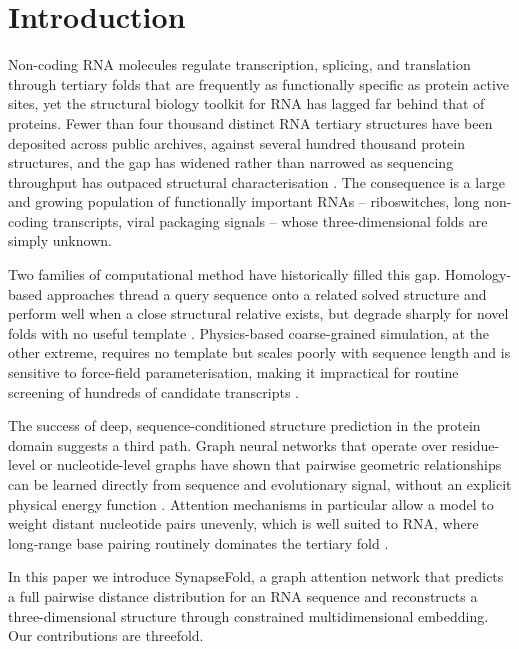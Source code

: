 \section{Introduction}
\label{sec:introduction}

Non-coding RNA molecules regulate transcription, splicing, and translation through tertiary folds that are frequently as functionally specific as protein active sites, yet the structural biology toolkit for RNA has lagged far behind that of proteins. Fewer than four thousand distinct RNA tertiary structures have been deposited across public archives, against several hundred thousand protein structures, and the gap has widened rather than narrowed as sequencing throughput has outpaced structural characterisation \citep{fischer2022benchmark}. The consequence is a large and growing population of functionally important RNAs -- riboswitches, long non-coding transcripts, viral packaging signals -- whose three-dimensional folds are simply unknown.

Two families of computational method have historically filled this gap. Homology-based approaches thread a query sequence onto a related solved structure and perform well when a close structural relative exists, but degrade sharply for novel folds with no useful template \citep{kowalski2019homology}. Physics-based coarse-grained simulation, at the other extreme, requires no template but scales poorly with sequence length and is sensitive to force-field parameterisation, making it impractical for routine screening of hundreds of candidate transcripts \citep{delgado2020nimbusfold}.

The success of deep, sequence-conditioned structure prediction in the protein domain suggests a third path. Graph neural networks that operate over residue-level or nucleotide-level graphs have shown that pairwise geometric relationships can be learned directly from sequence and evolutionary signal, without an explicit physical energy function \citep{voss2021attention,nguyen2018graphsage}. Attention mechanisms in particular allow a model to weight distant nucleotide pairs unevenly, which is well suited to RNA, where long-range base pairing routinely dominates the tertiary fold \citep{silva2020transformer}.

In this paper we introduce SynapseFold, a graph attention network that predicts a full pairwise distance distribution for an RNA sequence and reconstructs a three-dimensional structure through constrained multidimensional embedding. Our contributions are threefold.

